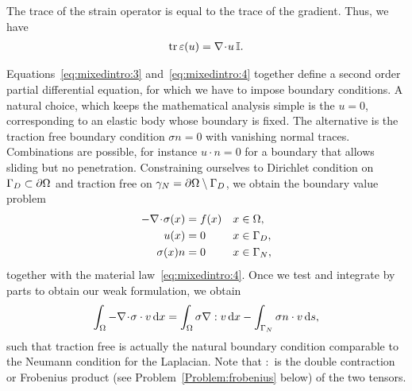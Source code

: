 \begin{remark}
  The trace of the strain operator is equal to the trace of the
  gradient. Thus, we have
  \begin{gather}
    \label{eq:mixedintro:5}
    \operatorname{tr} \varepsilon(u) = \nabla\!\cdot\! u \,\mathbb I.
  \end{gather}
\end{remark}

\begin{intro}
  Equations~\eqref{eq:mixedintro:3} and~\eqref{eq:mixedintro:4}
  together define a second order partial differential equation, for
  which we have to impose boundary conditions. A natural choice, which
  keeps the mathematical analysis simple is the  $u=0$, corresponding to an elastic body whose
  boundary is fixed. The alternative is the traction free boundary
  condition $\sigma n=0$ with vanishing normal traces. Combinations
  are possible, for instance $u\cdot n=0$ for a boundary that allows
  sliding but no penetration. Constraining ourselves to Dirichlet
  condition on $\Gamma_D\subset \partial\Omega$ and traction free on
  $\gamma_N = \partial\Omega\setminus\Gamma_D$, we obtain the
  boundary value problem
  \begin{gather}
    \label{eq:mixedintro:lame-navier-bvp}
    \begin{aligned}
      -\nabla\!\cdot\! \sigma(x) &= f(x) & x&\in\Omega,\\
      u(x) &= 0 & x&\in\Gamma_D, \\
      \sigma(x)n &=0& x&\in\Gamma_N,
    \end{aligned}
  \end{gather}
  together with the material law~\eqref{eq:mixedintro:4}.  Once we
  test and integrate by parts to obtain our weak formulation, we
  obtain
  \begin{gather*}
    \int_{\Omega} -\nabla\!\cdot\! \sigma \cdot v\,\mathrm{d} x
    = \int_{\Omega} \sigma\nabla: v\,\mathrm{d} x
    - \int_{\Gamma_N} \sigma n\cdot v\,\mathrm{d} s,
  \end{gather*}
  such that traction free is actually the natural boundary condition
  comparable to the Neumann condition for the Laplacian. Note that $:$
  is the double contraction or Frobenius product (see
  Problem~\ref{Problem:frobenius} below) of the two tensors.
\end{intro}

